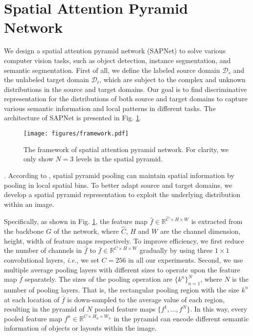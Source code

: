 \documentclass[runningheads]{llncs}
\def\ie{{\em i.e.}}
\begin{document}
\section{Spatial Attention Pyramid Network}
\label{sec:method}
We design a spatial attention pyramid network (SAPNet) to solve various computer vision tasks, such as object detection, instance segmentation, and semantic segmentation. First of all, we define the labeled source domain $\mathcal{D}_s$ and the unlabeled target domain $\mathcal{D}_t$, which are subject to the complex and unknown distributions in the source and target domains. Our goal is to find discriminative representation for the distributions of both source and target domains to capture various semantic information and local patterns in different tasks. The architecture of SAPNet is presented in Fig. \ref{fig:framework}.
\begin{figure}[t]
\centering
\texttt{[image: figures/framework.pdf]}
\caption{The framework of spatial attention pyramid network. For clarity, we only show $N=3$ levels in the spatial pyramid.}
\label{fig:framework}
\end{figure}

{.}
According to \cite{DBLP:journals/pami/HeZR015,DBLP:conf/cvpr/LazebnikSP06}, spatial pyramid pooling can maintain spatial information by pooling in local spatial bins. To better adapt source and target domains, we develop a spatial pyramid representation to exploit the underlying distribution within an image.

Specifically, as shown in Fig. \ref{fig:framework}, the feature map $\hat{f} \in \mathbb{R}^{\hat{C} \times H \times W}$ is extracted from the backbone $G$ of the network, where $\hat{C}$, $H$ and $W$ are the channel dimension, height, width of feature maps respectively. To improve efficiency, we first reduce the number of channels in $\hat{f}$ to $\bar{f} \in \mathbb{R}^{C \times H \times W}$ gradually by using three $1\times1$ convolutional layers, \ie, we set $C = 256$ in all our experiments. Second, we use multiple average pooling layers with different sizes to operate upon the feature map $\bar{f}$ separately. The sizes of the pooling operation are $\{k^{n}\}_{n=1}^{N}$, where $N$ is the number of pooling layers. That is, the rectangular pooling region with the size $k^n$ at each location of $\bar{f}$ is down-sampled to the average value of each region, resulting in the pyramid of $N$ pooled feature maps $\{f^1, \dots, f^N\}$. In this way, every pooled feature map $f^n \in \mathbb{R}^{C \times H_{n} \times W_{n}}$ in the pyramid can encode different semantic information of objects or layouts within the image.
\end{document}
